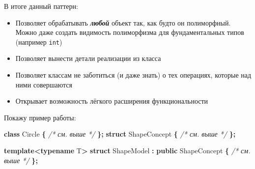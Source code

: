 \documentclass[14pt,a4paper]{article}
\providecommand{\tightlist}{%
	\setlength{\itemsep}{0pt}\setlength{\parskip}{0pt}}
\newenvironment{Shaded}{\begin{paragraph}}{\end{paragraph}}
\newenvironment{Highlighting}{\begin{paragraph}}{\end{paragraph}}
\newcommand{\KeywordTok}[1]{\textcolor[rgb]{0.13,0.29,0.53}{\textbf{#1}}}
\newcommand{\CommentTok}[1]{\textcolor[rgb]{0.56,0.35,0.01}{\textit{#1}}}
\newcommand{\OperatorTok}[1]{\textcolor[rgb]{0.81,0.36,0.00}{\textbf{#1}}}
\newcommand{\NormalTok}[1]{#1}
\begin{document}
В итоге данный паттерн:

\begin{itemize}
\tightlist
\item
  Позволяет обрабатывать \textbf{\emph{любой}} объект так, как будто он
  полиморфный. Можно даже создать видимость полиморфизма для
  фундаментальных типов (например \texttt{int})
\item
  Позволяет вынести детали реализации из класса
\item
  Позволяет классам не заботиться (и даже знать) о тех операциях,
  которые над ними совершаются
\item
  Открывает возможность лёгкого расширения функциональности
\end{itemize}

Покажу пример работы:

\begin{Shaded}
\begin{Highlighting}[]
\KeywordTok{class}\NormalTok{ Circle }\OperatorTok{\{} \CommentTok{/* см. выше */} \OperatorTok{\};}
\KeywordTok{struct}\NormalTok{ ShapeConcept }\OperatorTok{\{} \CommentTok{/* см. выше */} \OperatorTok{\};}

\KeywordTok{template}\OperatorTok{\textless{}}\KeywordTok{typename}\NormalTok{ T}\OperatorTok{\textgreater{}}
\KeywordTok{struct}\NormalTok{ ShapeModel }\OperatorTok{:} \KeywordTok{public}\NormalTok{ ShapeConcept }\OperatorTok{\{} \CommentTok{/* см. выше */} \OperatorTok{\};}


\end{Highlighting}
\end{Shaded}
\end{document}
